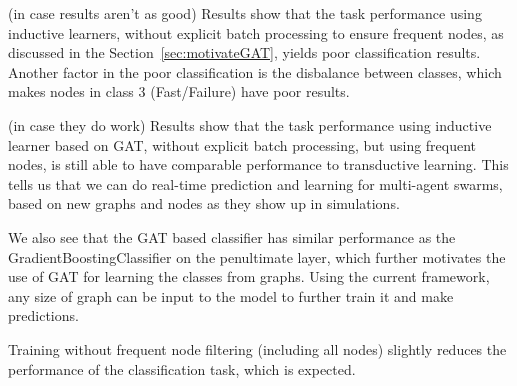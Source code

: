 (in case results aren't as good) Results show that the task performance using inductive learners, without explicit batch processing to ensure frequent nodes, as discussed in the Section~\ref{sec:motivateGAT}, 
yields poor classification results. Another factor in the poor classification is the disbalance between classes, which makes nodes in class 3 (Fast/Failure) have poor results. 

(in case they do work)
Results show that the task performance using inductive learner based on GAT, without explicit batch processing, but using frequent nodes, is still able to have comparable performance to 
transductive learning. This tells us that we can do real-time prediction and learning for multi-agent swarms, based on new graphs and nodes as they show up in simulations. 

We also see that the GAT based classifier has similar performance as the GradientBoostingClassifier on the penultimate layer, which further motivates the use 
of GAT for learning the classes from graphs. Using the current framework, any size of graph can be input to the model to further train it and make predictions. 

Training without frequent node filtering (including all nodes) slightly reduces the performance of the classification task, which is expected. 